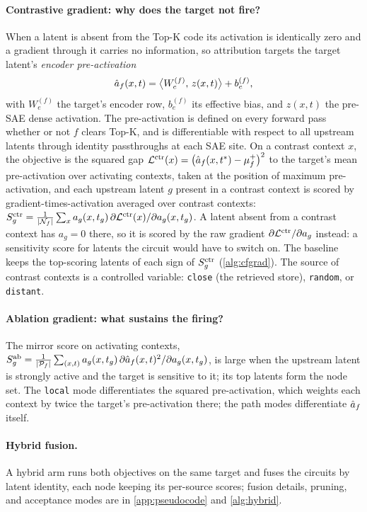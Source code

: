 \documentclass[10pt]{article}
\begin{document}
\paragraph{Contrastive gradient: why does the target not fire?}
When a latent is absent from the Top-K code its activation is identically zero and a gradient through it carries no information, so attribution targets the target latent's \emph{encoder pre-activation}
\[
    \hat{a}_f(x, t)
    = \bigl\langle W_e^{(f)},\, z(x, t) \bigr\rangle + b_e^{(f)},
\]
with $W_e^{(f)}$ the target's encoder row, $b_e^{(f)}$ its effective bias, and $z(x, t)$ the pre-SAE dense activation.
The pre-activation is defined on every forward pass whether or not $f$ clears Top-K, and is differentiable with respect to all upstream latents through identity passthroughs at each SAE site.
On a contrast context $x$, the objective is the squared gap $\mathcal{L}^{\mathrm{ctr}}(x) = \bigl(\hat{a}_f(x, t^{*}) - \mu_f^{+}\bigr)^{2}$ to the target's mean pre-activation over activating contexts, taken at the position of maximum pre-activation, and each upstream latent $g$ present in a contrast context is scored by gradient-times-activation averaged over contrast contexts:
$S_g^{\mathrm{ctr}} = \frac{1}{|\mathcal{N}_f|} \sum_{x} a_g(x, t_g) \, \partial \mathcal{L}^{\mathrm{ctr}}(x) / \partial a_g(x, t_g)$.
A latent absent from a contrast context has $a_g = 0$ there, so it is scored by the raw gradient $\partial \mathcal{L}^{\mathrm{ctr}} / \partial a_g$ instead: a sensitivity score for latents the circuit would have to switch on.
The baseline keeps the top-scoring latents of each sign of $S_g^{\mathrm{ctr}}$ (\cref{alg:cfgrad}).
The source of contrast contexts is a controlled variable: \texttt{close} (the retrieved store), \texttt{random}, or \texttt{distant}.

\paragraph{Ablation gradient: what sustains the firing?}
The mirror score on activating contexts,
$S_g^{\mathrm{ab}} = \frac{1}{|\mathcal{P}_f|} \sum_{(x,t)} a_g(x, t_g) \, \partial \hat{a}_f(x, t)^{2} / \partial a_g(x, t_g)$,
is large when the upstream latent is strongly active and the target is sensitive to it; its top latents form the node set.
The \texttt{local} mode differentiates the squared pre-activation, which weights each context by twice the target's pre-activation there; the path modes differentiate $\hat{a}_f$ itself.

\paragraph{Hybrid fusion.}
A hybrid arm runs both objectives on the same target and fuses the circuits by latent identity, each node keeping its per-source scores; fusion details, pruning, and acceptance modes are in \cref{app:pseudocode} and \cref{alg:hybrid}.
\end{document}

